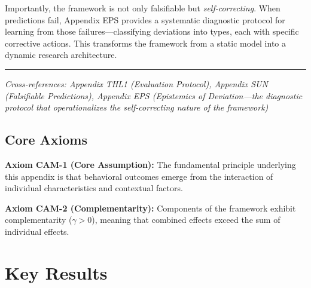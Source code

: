 Importantly, the framework is not only falsifiable but \textit{self-correcting}. When predictions fail, Appendix EPS provides a systematic diagnostic protocol for learning from those failures---classifying deviations into types, each with specific corrective actions. This transforms the framework from a static model into a dynamic research architecture.

\vspace{1em}
\hrule
\vspace{0.5em}
\noindent\textit{Cross-references: Appendix THL1 (Evaluation Protocol), 
Appendix SUN (Falsifiable Predictions), Appendix EPS (Epistemics of Deviation---the 
diagnostic protocol that operationalizes the self-correcting nature of the framework)}






\subsection{Core Axioms}
\label{sec:cam-axioms}

\begin{tcolorbox}[colback=yellow!5!white,colframe=yellow!75!black,title=Axiom CAM-1: Fundamental Principle]
\textbf{Axiom CAM-1 (Core Assumption):}
The fundamental principle underlying this appendix is that behavioral outcomes
emerge from the interaction of individual characteristics and contextual factors.
\end{tcolorbox}

\begin{tcolorbox}[colback=yellow!5!white,colframe=yellow!75!black,title=Axiom CAM-2: Complementarity]
\textbf{Axiom CAM-2 (Complementarity):}
Components of the framework exhibit complementarity ($\gamma > 0$), meaning
that combined effects exceed the sum of individual effects.
\end{tcolorbox}


\section{Key Results}
\label{sec:cam-results}

